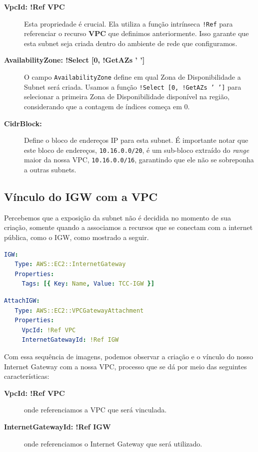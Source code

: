 \begin{description}
\item[\textbf{VpcId: !Ref VPC}] Esta propriedade é crucial. Ela utiliza a função intrínseca \texttt{!Ref} para referenciar o recurso \textbf{VPC} que definimos anteriormente. Isso garante que esta subnet seja criada dentro do ambiente de rede que configuramos.
\item[\textbf{AvailabilityZone: !Select [0, !GetAZs ' ']}] O campo \texttt{AvailabilityZone} define em qual Zona de Disponibilidade a Subnet será criada. Usamos a função \texttt{!Select [0, !GetAZs ' ']} para selecionar a primeira Zona de Disponibilidade disponível na região, considerando que a contagem de índices começa em 0.
\item[\textbf{CidrBlock:}] Define o bloco de endereços IP para esta subnet. É importante notar que este bloco de endereços, \texttt{10.16.0.0/20}, é um sub-bloco extraído do \textit{range} maior da nossa VPC, \texttt{10.16.0.0/16}, garantindo que ele não se sobreponha a outras subnets.
\end{description}

\subsection{Vínculo do IGW com a VPC}
Percebemos que a exposição da subnet não é decidida no momento de sua criação, somente quando a associamos a recursos que se conectam com a internet pública, como o IGW, como mostrado a seguir.

\begin{lstlisting}[language=yaml, float=htbp]
 IGW:
   Type: AWS::EC2::InternetGateway
   Properties:
     Tags: [{ Key: Name, Value: TCC-IGW }]
\end{lstlisting}

\begin{lstlisting}[language=yaml, float=htbp]
 AttachIGW:
   Type: AWS::EC2::VPCGatewayAttachment
   Properties:
     VpcId: !Ref VPC
     InternetGatewayId: !Ref IGW
\end{lstlisting}
Com essa sequência de imagens, podemos observar a criação e o vínculo do nosso Internet Gateway com a nossa VPC, processo que se dá por meio das seguintes características:
\begin{description}
\item [\textbf{VpcId: !Ref VPC}] onde referenciamos a VPC que será vinculada.
\item [\textbf{InternetGatewayId: !Ref IGW}] onde referenciamos o Internet Gateway que será utilizado.
\end{description}


